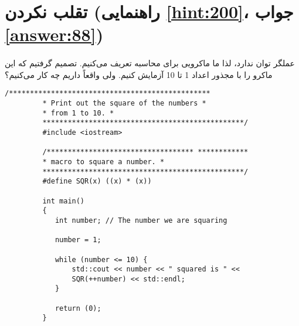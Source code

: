 \section[تقلب نکردن]{تقلب نکردن \protect{} (راهنمایی \ref{hint:200}، جواب \ref{answer:88})}
\paragraph{}\label{prog:79}
 عملگر توان ندارد، لذا ما ماکرویی برای محاسبه  تعریف می‌کنیم. تصمیم گرفتیم که این ماکرو را با مجذور اعداد 1 تا 10 آزمایش کنیم. ولی واقعاً داریم چه کار می‌کنیم؟

\begin{LTR}
    \begin{lstlisting}[style=C++Style]
         /************************************************
         * Print out the square of the numbers *
         * from 1 to 10. *
         ************************************************/
         #include <iostream>

         /*********************************** ************
         * macro to square a number. *
         ************************************************/
         #define SQR(x) ((x) * (x))

         int main()
         {
         	int number; // The number we are squaring

         	number = 1;

         	while (number <= 10) {
         		std::cout << number << " squared is " <<
         		SQR(++number) << std::endl;
         	}

         	return (0);
         }
    \end{lstlisting}
\end{LTR}